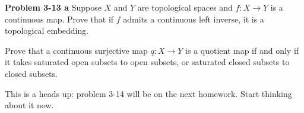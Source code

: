 \documentclass[minion]{homework651}
\begin{document}
\begin{problems}
\problem\textbf{Problem 3-13 a} Suppose $X$ and $Y$ are topological spaces and $f: X \to Y$ is a continuous map. Prove that if $f$ admits 
a continuous left inverse, it is a topological embedding. 


\problem {} Prove that a continuous surjective map $q: X \to Y$ is a quotient map if and only if it takes saturated open subsets to open subsets, 
or saturated closed subsets to closed subsets. 






\problem This is a heads up: problem 3-14 will be on the next homework.  Start thinking about it now.  
\end{problems}
\end{document}
